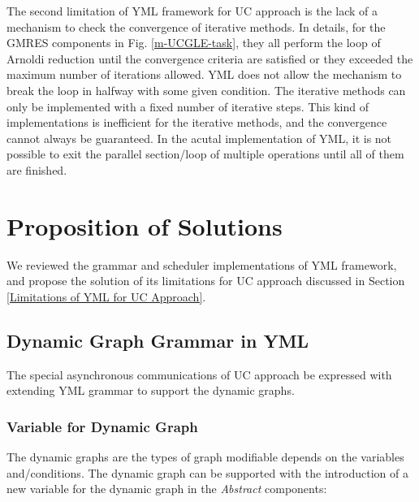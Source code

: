 The second limitation of YML framework for UC approach is the lack of a mechanism to check the convergence of iterative methods. In details, for the GMRES components in Fig. \ref{m-UCGLE-task}, they all perform the loop of Arnoldi reduction until the convergence criteria are satisfied or they exceeded the maximum number of iterations allowed. YML does not allow the mechanism to break the loop in halfway with some given condition. The iterative methods can only be implemented with a fixed number of iterative steps. This kind of implementations is inefficient for the iterative methods, and the convergence cannot always be guaranteed. In the acutal implementation of YML, it is not possible to exit the parallel section/loop of multiple operations until all of them are finished. 


\section{Proposition of Solutions}

We reviewed the grammar and scheduler implementations of YML framework, and propose the solution of its limitations for UC approach discussed in Section \ref{Limitations of YML for UC Approach}.

\subsection{Dynamic Graph Grammar in YML}

The special asynchronous communications of UC approach be expressed with extending YML grammar to support the dynamic graphs.

\subsubsection{Variable for Dynamic Graph}\label{Variable for Dynamic Graph}

The dynamic graphs are the types of graph modifiable depends on the variables and/conditions. The dynamic graph can be supported with the introduction of a new variable for the dynamic graph in the \textit{Abstract} components:

